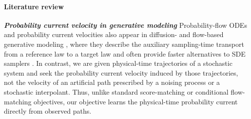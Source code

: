 \documentclass[oneside,11pt]{article}
\theoremstyle{remark}
\begin{document}
\paragraph{Literature review}

























\textbf{\emph{Probability current velocity in generative modeling}}
Probability-flow ODEs and probability current velocities also appear in diffusion- and flow-based generative modeling
\cite{song-sohl-dickstein-kingma-etal:2021,lipman2023flow,albergo-vanden-eijnden:2022,albergo-boffi-vanden-eijnden:2025,na-lee-yun-etal:2025},
where they describe the auxiliary sampling-time transport from a reference law to a target law and often provide faster alternatives to SDE samplers
\cite{chen-chewi-lee-etal:2023}.
In contrast, we are given physical-time trajectories of a stochastic system and seek the probability current velocity induced by those trajectories, not the velocity of an artificial path prescribed by a noising process or a stochastic interpolant.
Thus, unlike standard score-matching or conditional flow-matching objectives, our objective learns the physical-time probability current directly from observed paths.
\end{document}
